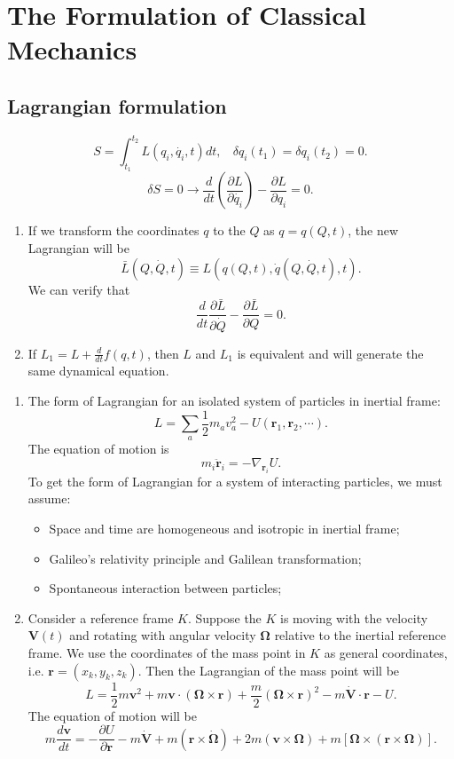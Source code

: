 \chapter{The Formulation of Classical Mechanics}
\section{Lagrangian formulation}
\[S=\int_{t_1}^{t_2}L(q_i,\dot{q_i},t)dt, \ \ \ \ \delta q_i(t_1) = \delta q_i(t_2) = 0.\]
\[\delta S=0 \rightarrow \frac{d}{dt}(\frac{\partial L}{\partial \dot{q_i}}) - \frac{\partial L}{\partial q_i}=0.\]

\begin{enumerate}
\item If we transform the coordinates $q$ to the $Q$ as $q = q(Q,t)$, the new Lagrangian will be
\[\bar{L}(Q,\dot{Q},t) \equiv L(q(Q,t),\dot{q}(Q,\dot{Q},t),t).\]
We can verify that
\[\frac{d}{dt}\frac{\partial \bar{L}}{\partial \dot{Q}} - \frac{\partial \bar{L}}{\partial Q} = 0.\]
\item If $L_1 = L + \frac{d}{dt} f(q,t)$, then $L$ and $L_1$ is equivalent and will generate the same dynamical equation.
\end{enumerate}

\begin{example}
\begin{enumerate}
\item The form of Lagrangian for an isolated system of particles in inertial frame:
\[L=\sum_a \frac{1}{2}m_a v_a^2 -U(\bm{r}_1,\bm{r}_2,\cdots).\]
The equation of motion is
\[m_i \ddot{\bm{r}}_i = -\nabla_{\bm{r}_i} U.\]
To get the form of Lagrangian for a system of interacting particles, we must assume:
\begin{itemize}
\item Space and time are homogeneous and isotropic in inertial frame;
\item Galileo's relativity principle and Galilean transformation;
\item Spontaneous interaction between particles;
\end{itemize}
\item Consider a reference frame $K$. Suppose the $K$ is moving with the velocity $\bm{V}(t)$ and  rotating with angular velocity $\bm{\Omega}$  relative to the inertial reference frame. We use the coordinates of the mass point in $K$ as general coordinates, i.e. $\bm{r} = (x_k,y_k,z_k)$. Then the Lagrangian of the mass point will be
\[L = \frac{1}{2}m\bm{v}^2 + m\bm{v}\cdot(\bm{\Omega}\times\bm{r})+\frac{m}{2}(\bm{\Omega}\times\bm{r})^2 - m\dot{\bm{V}}\cdot\bm{r}-U.\]
The equation of motion will be
\[m\frac{d\bm{v}}{dt} = -\frac{\partial U}{\partial \bm{r}} - m\dot{\bm{V}} + m(\bm{r} \times \dot{\bm{\Omega}}) + 2m(\bm{v} \times \bm{\Omega}) + m[\bm{\Omega}\times(\bm{r} \times \bm{\Omega})].\]
\end{enumerate}
\end{example}

